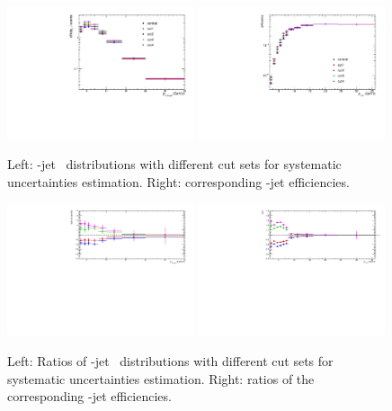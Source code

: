 \begin{figure}[bth]
\begin{center}
\includegraphics[width=0.49\textwidth]{pPbplots/jetSpectra/jetRawSpectra_pTD_pTD3}
\includegraphics[width=0.49\textwidth]{pPbplots/jetSpectra/efficiencies}
\caption{Left: \Dstar-jet \pt\ distributions with different cut sets for systematic uncertainties estimation. Right: corresponding \Dstar-jet efficiencies.} 
\label{fig:JetPtRawSys}
\end{center}
\end{figure}

\begin{figure}[bth]
\begin{center}
\includegraphics[width=0.49\textwidth]{pPbplots/jetSpectra/jetRawSpectraRatio_pTD_pTD3}
\includegraphics[width=0.49\textwidth]{pPbplots/jetSpectra/efficienciesRatio}
\caption{Left: Ratios of \Dstar-jet \pt\ distributions with different cut sets for systematic uncertainties estimation. Right: ratios of the corresponding \Dstar-jet efficiencies.} 
\label{fig:JetPtRawSysRatio}
\end{center}
\end{figure}


